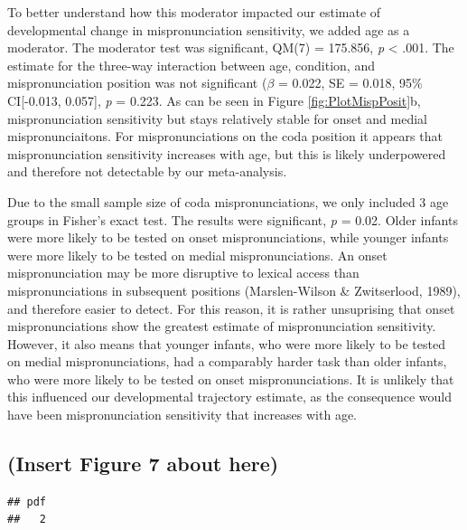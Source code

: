 \documentclass[man]{apa6}
\theoremstyle{definition}
\theoremstyle{definition}
\theoremstyle{definition}
\theoremstyle{remark}
\begin{document}
To better understand how this moderator impacted our estimate of
developmental change in mispronunciation sensitivity, we added age as a
moderator. The moderator test was significant, QM(7) = 175.856, \emph{p}
\textless{} .001. The estimate for the three-way interaction between
age, condition, and mispronunciation position was not significant
(\(\beta\) = 0.022, SE = 0.018, 95\% CI{[}-0.013, 0.057{]}, \emph{p} =
0.223. As can be seen in Figure \ref{fig:PlotMispPosit}b,
mispronunciation sensitivity but stays relatively stable for onset and
medial mispronunciaitons. For mispronunciations on the coda position it
appears that mispronunciation sensitivity increases with age, but this
is likely underpowered and therefore not detectable by our
meta-analysis.

Due to the small sample size of coda mispronunciations, we only included
3 age groups in Fisher's exact test. The results were significant,
\emph{p} = 0.02. Older infants were more likely to be tested on onset
mispronunciations, while younger infants were more likely to be tested
on medial mispronunciations. An onset mispronunciation may be more
disruptive to lexical access than mispronunciations in subsequent
positions (Marslen-Wilson \& Zwitserlood, 1989), and therefore easier to
detect. For this reason, it is rather unsuprising that onset
mispronunciations show the greatest estimate of mispronunciation
sensitivity. However, it also means that younger infants, who were more
likely to be tested on medial mispronunciations, had a comparably harder
task than older infants, who were more likely to be tested on onset
mispronunciations. It is unlikely that this influenced our developmental
trajectory estimate, as the consequence would have been mispronunciation
sensitivity that increases with age.

\subsection{(Insert Figure 7 about
here)}\label{insert-figure-7-about-here}

\begin{verbatim}
## pdf 
##   2
\end{verbatim}
\end{document}
